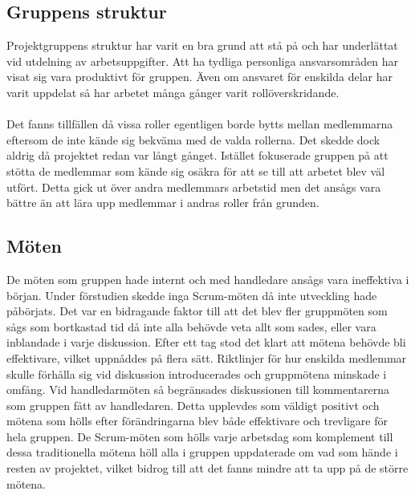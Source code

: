 \subsection{Gruppens struktur}
Projektgruppens struktur har varit en bra grund att stå på och har underlättat vid utdelning av arbetsuppgifter. Att ha tydliga personliga ansvarsområden har visat sig vara produktivt för gruppen. Även om ansvaret för enskilda delar har varit uppdelat så har arbetet många gånger varit rollöverskridande.
\\ \\
Det fanns tillfällen då vissa roller egentligen borde bytts mellan medlemmarna eftersom de inte kände sig bekväma med de valda rollerna. Det skedde dock aldrig då projektet redan var långt gånget. Istället fokuserade gruppen på att stötta de medlemmar som kände sig osäkra för att se till att arbetet blev väl utfört. Detta gick ut över andra medlemmars arbetstid men det ansågs vara bättre än att lära upp medlemmar i andras roller från grunden. 

\subsection{Möten}
De möten som gruppen hade internt och med handledare ansågs vara ineffektiva i början. Under förstudien skedde inga Scrum-möten då inte utveckling hade påbörjats. Det var en bidragande faktor till att det blev fler gruppmöten som sågs som bortkastad tid då inte alla behövde veta allt som sades, eller vara inblandade i varje diskussion. Efter ett tag stod det klart att mötena behövde bli effektivare, vilket uppnåddes på flera sätt. Riktlinjer för hur enskilda medlemmar skulle förhålla sig vid diskussion introducerades och gruppmötena minskade i omfång. Vid handledarmöten så begränsades diskussionen till kommentarerna som gruppen fått av handledaren. Detta upplevdes som väldigt positivt och mötena som hölls efter förändringarna blev både effektivare och trevligare för hela gruppen. De Scrum-möten som hölls varje arbetsdag som komplement till dessa traditionella mötena höll alla i gruppen uppdaterade om vad som hände i resten av projektet, vilket bidrog till att det fanns mindre att ta upp på de större mötena.


